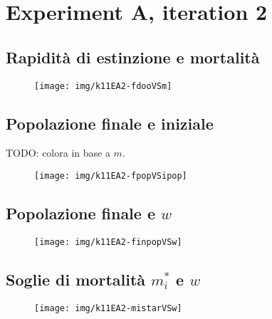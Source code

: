 \section{Experiment A, iteration 2}

\subsection{Rapidità di estinzione e mortalità}
\begin{figure}[pbh]
    \centering
    \texttt{[image: img/k11EA2-fdooVSm]}

    \caption[Experiment A2:1]{}

    \label{img:kh11expA21}
\end{figure}

\subsection{Popolazione finale e iniziale}
TODO: colora in base a $m$. %
\begin{figure}[pbh]
    \centering
    \texttt{[image: img/k11EA2-fpopVSipop]}

    \caption[Experiment A2:2]{}

    \label{img:kh11expA22}
\end{figure}

\subsection{Popolazione finale e $w$}
\begin{figure}[pbh]
    \centering
    \texttt{[image: img/k11EA2-finpopVSw]}

    \caption[Experiment A2:3]{}

    \label{img:kh11expA23}
\end{figure}

\subsection{Soglie di mortalità $m_i^*$ e $w$}
\begin{figure}[pbh]
    \centering
    \texttt{[image: img/k11EA2-mistarVSw]}

    \caption[Experiment A2:4]{}

    \label{img:kh11expA24}
\end{figure}
